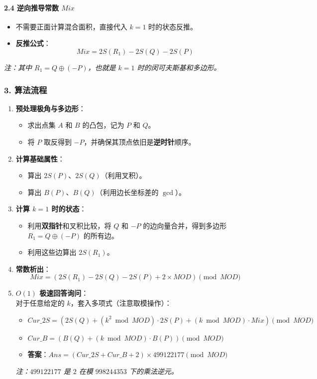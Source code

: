\paragraph{2.4 逆向推导常数 $Mix$}
\begin{itemize}
    \item 不需要正面计算混合面积，直接代入 $k=1$ 时的状态反推。
    \item \textbf{反推公式}：
    $$Mix = 2S(R_1) - 2S(Q) - 2S(P)$$
\end{itemize}
\textit{注：其中 $R_1 = Q \oplus (-P)$，也就是 $k=1$ 时的闵可夫斯基和多边形。}

\hrulefill

\subsubsection*{3. 算法流程}

\begin{enumerate}
    \item \textbf{预处理极角与多边形}：
    \begin{itemize}
        \item 求出点集 $A$ 和 $B$ 的凸包，记为 $P$ 和 $Q$。
        \item 将 $P$ 取反得到 $-P$，并确保其顶点依旧是\textbf{逆时针}顺序。
    \end{itemize}
    \item \textbf{计算基础属性}：
    \begin{itemize}
        \item 算出 $2S(P)$、$2S(Q)$（利用叉积）。
        \item 算出 $B(P)$、$B(Q)$（利用边长坐标差的 $\gcd$）。
    \end{itemize}
    \item \textbf{计算 $k=1$ 时的状态}：
    \begin{itemize}
        \item 利用\textbf{双指针}和叉积比较，将 $Q$ 和 $-P$ 的边向量合并，得到多边形 $R_1 = Q \oplus (-P)$ 的所有边。
        \item 利用这些边算出 $2S(R_1)$。
    \end{itemize}
    \item \textbf{常数析出}：
    $$Mix = (2S(R_1) - 2S(Q) - 2S(P) + 2 \times MOD) \pmod{MOD}$$
    \item \textbf{$O(1)$ 极速回答询问}：\\
    对于任意给定的 $k$，套入多项式（注意取模操作）：
    \begin{itemize}
        \item $Cur\_2S = (2S(Q) + (k^2 \bmod MOD) \cdot 2S(P) + (k \bmod MOD) \cdot Mix) \pmod{MOD}$
        \item $Cur\_B = (B(Q) + (k \bmod MOD) \cdot B(P)) \pmod{MOD}$
        \item \textbf{答案}：$Ans = (Cur\_2S + Cur\_B + 2) \times 499122177 \pmod{MOD}$
    \end{itemize}
    \textit{注：$499122177$ 是 $2$ 在模 $998244353$ 下的乘法逆元。}
\end{enumerate}